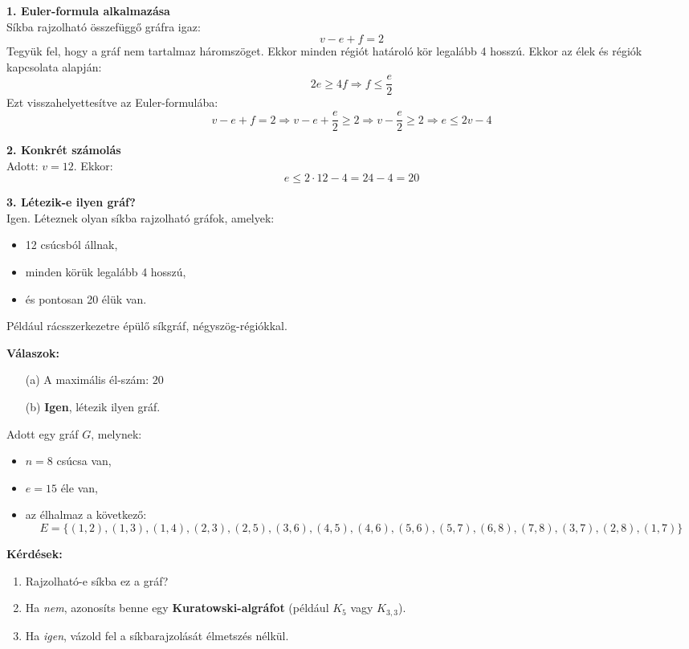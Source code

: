 \begin{solution}
	\textbf{1. Euler-formula alkalmazása}\\
	Síkba rajzolható összefüggő gráfra igaz:
	\[
	v-e+f=2
	\]
	Tegyük fel, hogy a gráf nem tartalmaz háromszöget. Ekkor minden régiót
	határoló kör legalább 4 hosszú.
	Ekkor az élek és régiók kapcsolata alapján:
	\[
	2e\geq4f\Rightarrow f\leq\frac{e}{2}
	\]
	Ezt visszahelyettesítve az Euler-formulába:
	\[
	v-e+f=2\Rightarrow v-e+\frac{e}{2}\geq2\Rightarrow v-\frac{e}{2}\geq2\Rightarrow e\leq2v-4
	\]
	
	\textbf{2. Konkrét számolás}\\
	Adott: $v=12$. Ekkor:
	\[
	e\leq2\cdot12-4=24-4=\boxed{20}
	\]
	
	\textbf{3. Létezik-e ilyen gráf?}\\
	Igen. Léteznek olyan síkba rajzolható gráfok, amelyek: 
	\begin{itemize}
		\item 12 csúcsból állnak, 
		\item minden körük legalább 4 hosszú, 
		\item és pontosan 20 élük van. 
	\end{itemize}
	Például rácsszerkezetre épülő síkgráf, négyszög-régiókkal.
	
	\textbf{Válaszok:}
	\begin{itemize}
		\item[(a)] A maximális él-szám: $\boxed{20}$ 
		\item[(b)] \textbf{Igen}, létezik ilyen gráf. 
	\end{itemize}
\end{solution}
\begin{extraproblem}
	Adott egy gráf $G$, melynek:
	\begin{itemize}
		\item $n=8$ csúcsa van, 
		\item $e=15$ éle van, 
		\item az élhalmaz a következő: 
		\[
		E=\{(1,2),(1,3),(1,4),(2,3),(2,5),(3,6),(4,5),(4,6),(5,6),(5,7),(6,8),(7,8),(3,7),(2,8),(1,7)\}
		\]
	\end{itemize}
	\noindent\textbf{Kérdések:} 
	\begin{enumerate}
		\item Rajzolható-e síkba ez a gráf? 
		\item Ha \emph{nem}, azonosíts benne egy \textbf{Kuratowski-algráfot} (például
		$K_{5}$ vagy $K_{3,3}$). 
		\item Ha \emph{igen}, vázold fel a síkbarajzolását élmetszés nélkül. 
	\end{enumerate}
\end{extraproblem}
